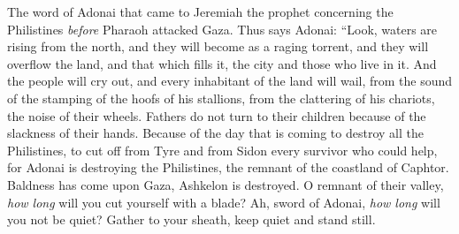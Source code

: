 \begin{biblechapter} %
 The word of Adonai that came to Jeremiah the prophet concerning the Philistines \textit{before} Pharaoh attacked Gaza.
\verse Thus says Adonai:
\verse “Look, waters are rising from the north, 
and they will become as a raging torrent, 
and they will overflow the land, 
and that which fills it, 
the city and those who live in it. 
And the people will cry out, 
and every inhabitant of the land will wail,
\verse from the sound of the stamping of the hoofs of his stallions, 
from the clattering of his chariots, 
the noise of their wheels. 
Fathers do not turn to their children 
because of the slackness of their hands.
\verse Because of the day that is coming 
to destroy all the Philistines, 
to cut off from Tyre and from Sidon 
every survivor who could help, 
for Adonai is destroying the Philistines, 
the remnant of the coastland of Caphtor.
\verse Baldness has come upon Gaza, 
Ashkelon is destroyed. 
O remnant of their valley, 
\textit{how long} will you cut yourself with a blade?
\verse Ah, sword of Adonai, 
\textit{how long} will you not be quiet? 
Gather to your sheath, 
keep quiet and stand still.
\end{biblechapter}

